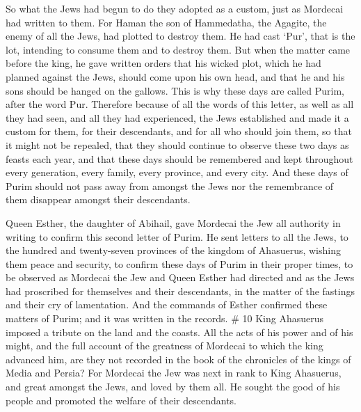  So what the Jews had begun to do they adopted as a custom,
just as Mordecai had written to them.  For Haman the son of
Hammedatha, the Agagite, the enemy of all the Jews, had plotted to
destroy them. He had cast `Pur', that is the lot, intending to consume
them and to destroy them.  But when the matter came before
the king, he gave written orders that his wicked plot, which he had
planned against the Jews, should come upon his own head, and that he and
his sons should be hanged on the gallows.  This is why
these days are called Purim, after the word Pur. Therefore because of
all the words of this letter, as well as all they had seen, and all they
had experienced,  the Jews established and made it a custom
for them, for their descendants, and for all who should join them, so
that it might not be repealed, that they should continue to observe
these two days as feasts each year,  and that these days
should be remembered and kept throughout every generation, every family,
every province, and every city. And these days of Purim should not pass
away from amongst the Jews nor the remembrance of them disappear amongst
their descendants.

 Queen Esther, the daughter of Abihail, gave Mordecai the
Jew all authority in writing to confirm this second letter of Purim.
 He sent letters to all the Jews, to the hundred and
twenty-seven provinces of the kingdom of Ahasuerus, wishing them peace
and security,  to confirm these days of Purim in their
proper times, to be observed as Mordecai the Jew and Queen Esther had
directed and as the Jews had proscribed for themselves and their
descendants, in the matter of the fastings and their cry of lamentation.
 And the commands of Esther confirmed these matters of
Purim; and it was written in the records. \# 10  King
Ahasuerus imposed a tribute on the land and the coasts.  All
the acts of his power and of his might, and the full account of the
greatness of Mordecai to which the king advanced him, are they not
recorded in the book of the chronicles of the kings of Media and Persia?
 For Mordecai the Jew was next in rank to King Ahasuerus,
and great amongst the Jews, and loved by them all. He sought the good of
his people and promoted the welfare of their descendants.
